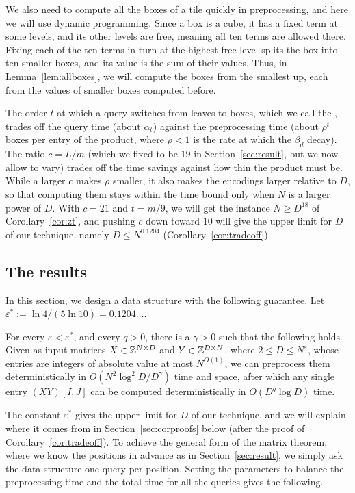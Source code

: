We also need to compute all the boxes of a tile quickly in preprocessing, and here we will use dynamic programming. Since a box is a cube, it has a fixed term at some levels, and its other levels are free, meaning all ten terms are allowed there. Fixing each of the ten terms in turn at the highest free level splits the box into ten smaller boxes, and its value is the sum of their values. Thus, in Lemma~\ref{lem:allboxes}, we will compute the boxes from the smallest up, each from the values of smaller boxes computed before.

The order $t$ at which a query switches from leaves to boxes, which we call the , trades off the query time (about $\alpha_t$) against the preprocessing time (about $\rho^t$ boxes per entry of the product, where $\rho<1$ is the rate at which the $\beta_d$ decay). The ratio $c=L/m$ (which we fixed to be $19$ in Section~\ref{sec:result}, but we now allow to vary) trades off the time savings against how thin the product must be. While a larger $c$ makes $\rho$ smaller, it also makes the encodings larger relative to $D$, so that computing them stays within the time bound only when $N$ is a larger power of $D$. With $c=21$ and $t=m/9$, we will get the instance $N\ge D^{18}$ of Corollary~\ref{cor:zt}, and pushing $c$ down toward $10$ will give the upper limit for $D$ of our technique, namely $D\le N^{0.1204}$  (Corollary~\ref{cor:tradeoff}).

\subsection{The results}\label{sec:results}

In this section, we design a data structure with the following guarantee. Let $\varepsilon^*:=\ln4/(5\ln10)=0.1204\ldots$.

\begin{theorem}\label{thm:single}
For every $\varepsilon<\varepsilon^*$, and every $q>0$, there is a $\gamma>0$ such that the following holds. Given as input matrices $X\in\mathbb{Z}^{N\times D}$ and $Y\in\mathbb{Z}^{D\times N}$, where $2\le D\le N^{\varepsilon}$, whose entries are integers of absolute value at most $N^{O(1)}$, we can preprocess them deterministically in $O(N^2\log^2\!D/D^{\gamma})$ time and space, after which any single entry $(XY)[I,J]$ can be computed deterministically in $O(D^{q}\log D)$ time.
\end{theorem}

The constant $\varepsilon^*$ gives the upper limit for $D$ of our technique, and we will explain where it comes from in Section~\ref{sec:corproofs} below (after the proof of Corollary~\ref{cor:tradeoff}). To achieve the general form of the matrix theorem, where we know the positions in advance as in Section~\ref{sec:result}, we simply ask the data structure one query per position. Setting the parameters to balance the preprocessing time and the total time for all the queries gives the following.

